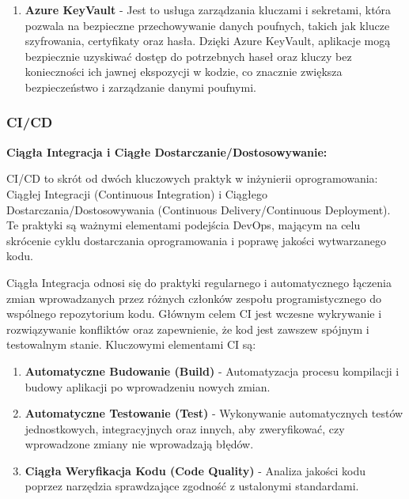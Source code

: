 \begin{enumerate}
\item {\bf Azure KeyVault} - Jest to usługa zarządzania kluczami i sekretami, która pozwala na bezpieczne przechowywanie danych poufnych, takich jak klucze szyfrowania, certyfikaty oraz hasła. Dzięki Azure KeyVault, aplikacje mogą bezpiecznie uzyskiwać dostęp do potrzebnych haseł oraz kluczy bez konieczności ich jawnej ekspozycji w kodzie, co znacznie zwiększa bezpieczeństwo i zarządzanie danymi poufnymi.

\end{enumerate}

\subsubsection{CI/CD}
{\bf Ciągła Integracja i Ciągłe Dostarczanie/Dostosowywanie:}

\noindent CI/CD to skrót od dwóch kluczowych praktyk w inżynierii oprogramowania: Ciągłej Integracji (Continuous Integration) i Ciągłego Dostarczania/Dostosowywania (Continuous Delivery/Continuous Deployment). Te praktyki są ważnymi elementami podejścia DevOps, mającym na celu skrócenie cyklu dostarczania oprogramowania i poprawę jakości wytwarzanego kodu.
\\


\noindent Ciągła Integracja odnosi się do praktyki regularnego i automatycznego łączenia zmian wprowadzanych przez różnych członków zespołu programistycznego do wspólnego repozytorium kodu. Głównym celem CI jest wczesne wykrywanie i rozwiązywanie konfliktów oraz zapewnienie, że kod jest zawsze\linebreak w spójnym i testowalnym stanie. Kluczowymi elementami CI są:

\begin{enumerate}
\item {\bf Automatyczne Budowanie (Build)}
- Automatyzacja procesu kompilacji i budowy aplikacji po wprowadzeniu nowych zmian.

\item {\bf Automatyczne Testowanie (Test)}
   - Wykonywanie automatycznych testów jednostkowych, integracyjnych oraz innych, aby zweryfikować, czy wprowadzone zmiany nie wprowadzają błędów.

\item {\bf Ciągła Weryfikacja Kodu (Code Quality)}
   - Analiza jakości kodu poprzez narzędzia sprawdzające zgodność z ustalonymi standardami.
\end{enumerate}

